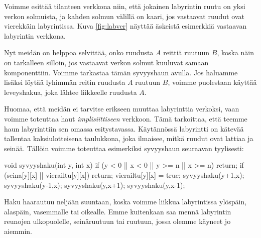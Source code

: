 Voimme esittää tilanteen verkkona niin,
että jokainen labyrintin ruutu on yksi verkon solmuista,
ja kahden solmun välillä on kaari,
jos vastaavat ruudut ovat vierekkäin labyrintissa.
Kuva \ref{fig:labver} näyttää äskeistä esimerkkiä vastaavan
labyrintin verkkona.

Nyt meidän on helppoa selvittää, onko ruudusta $A$ reittiä
ruutuun $B$, koska näin on tarkalleen silloin,
jos vastaavat verkon solmut kuuluvat samaan komponenttiin.
Voimme tarkastaa tämän syvyyshaun avulla.
Jos haluamme lisäksi löytää lyhimmän reitin ruudusta $A$
ruutuun $B$, voimme puolestaan käyttää leveyshakua,
joka lähtee liikkeelle ruudusta $A$.

Huomaa, että meidän ei tarvitse erikseen muuttaa labyrinttia
verkoksi, vaan voimme toteuttaa haut \emph{implisiittiseen} verkkoon.
Tämä tarkoittaa, että teemme haun labyrinttiin sen omassa
esitystavassa. Käytännössä labyrintti on kätevää tallentaa kaksiulotteisena
taulukkona, joka ilmaisee, mitkä ruudut ovat lattiaa ja seinää.
Tällöin voimme toteuttaa esimerkiksi syvyyshaun seuraavan tyylisesti:

\begin{code}
void syvyyshaku(int y, int x) {
    if (y < 0 || x < 0 || y >= n || x >= n) return;
    if (seina[y][x] || vierailtu[y][x]) return;
    vierailtu[y][x] = true;
    syvyyshaku(y+1,x);
    syvyyshaku(y-1,x);
    syvyyshaku(y,x+1);
    syvyyshaku(y,x-1);
}
\end{code}

Haku haarautuu neljään suuntaan, koska voimme liikkua labyrintissa
ylöspäin, alaspäin, vasemmalle tai oikealle.
Emme kuitenkaan saa mennä labyrintin reunojen ulkopuolelle,
seinäruutuun tai ruutuun, jossa olemme käyneet jo aiemmin.